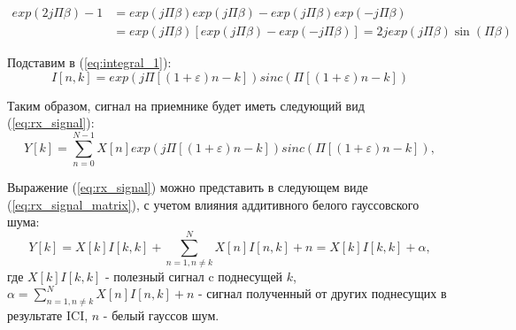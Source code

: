\begin{equation}
    \label{eq:integral_2}
    \begin{split}
        exp(2 j \Pi \beta ) - 1 &= exp(j \Pi \beta ) exp(j \Pi \beta ) - exp(j \Pi \beta ) exp(-j \Pi \beta ) \\
        &= exp(j \Pi \beta) [exp(j \Pi \beta) - exp(- j \Pi \beta)] = 2 j exp(j \Pi \beta) \sin(\Pi \beta)
    \end{split}
\end{equation}

\noindent Подставим в (\ref{eq:integral_1}):
\begin{equation}
    I[n, k] = exp(j \Pi [(1 + \varepsilon )n - k]) sinc(\Pi [ (1 + \varepsilon) n - k])
    \label{eq:matrix}
\end{equation}

\noindent Таким образом, сигнал на приемнике будет иметь следующий вид (\ref{eq:rx_signal}):
\begin{equation}
    Y[k] = \sum_{n = 0}^{N - 1} X[n] exp(j \Pi [(1 + \varepsilon )n - k]) sinc(\Pi [ (1 + \varepsilon) n - k]),
    \label{eq:rx_signal}
\end{equation}

\newpage
Выражение (\ref{eq:rx_signal}) можно представить в следующем виде (\ref{eq:rx_signal_matrix}), с
учетом влияния аддитивного белого гауссовского шума:
\begin{equation}
    Y[k] = X[k] I[k, k] + \sum_{n = 1, n \neq k}^{N} X[n] I[n, k] + n = X[k] I[k, k] + \alpha ,
    \label{eq:rx_signal_matrix}
\end{equation}
\noindent где $X[k] I[k, k]$ - полезный сигнал c поднесущей $k$, $\alpha = \sum_{n = 1, n \neq k}^{N} X[n] I[n, k] + n$
- сигнал полученный от других поднесущих в результате ICI, $n$ - белый гауссов шум.


